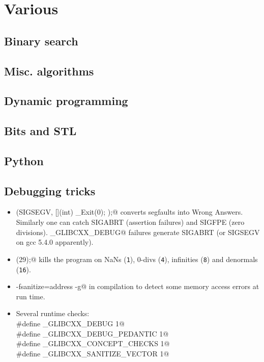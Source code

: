 \chapter{Various}

\section{Binary search}

\section{Misc. algorithms}

\section{Dynamic programming}

\section{Bits and STL}

\section{Python}

\section{Debugging tricks}
	\begin{itemize}
		\item \verb@signal(SIGSEGV, [](int) { _Exit(0); });@ converts segfaults into Wrong Answers.
			Similarly one can catch SIGABRT (assertion failures) and SIGFPE (zero divisions).
			\verb@_GLIBCXX_DEBUG@ failures generate SIGABRT (or SIGSEGV on gcc 5.4.0 apparently).
		\item \verb@feenableexcept(29);@ kills the program on NaNs (\texttt 1), 0-divs (\texttt 4), infinities (\texttt 8) and denormals (\texttt{16}).
		\item \verb@-fsanitize=address -g@ in compilation to detect some memory access errors at run time.
		\item Several runtime checks: \\ \verb@#define _GLIBCXX_DEBUG 1@ \\ \verb@#define _GLIBCXX_DEBUG_PEDANTIC 1@
			\\ \verb@#define _GLIBCXX_CONCEPT_CHECKS 1@ \\ \verb@#define _GLIBCXX_SANITIZE_VECTOR 1@
	\end{itemize}


